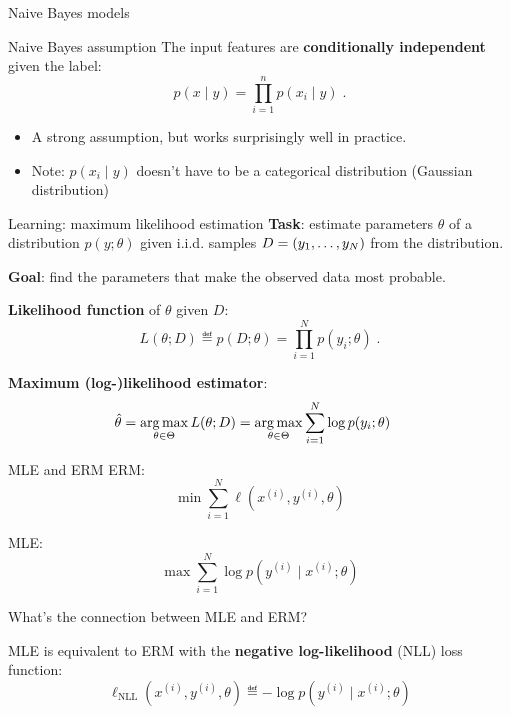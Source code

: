 \documentclass[usenames,dvipsnames,notes,11pt,aspectratio=169]{beamer}
\newcommand{\pdfnote}[1]{}
\begin{document}
\begin{frame}
    {Naive Bayes models}
    \begin{block}
    {Naive Bayes assumption}
        The input features are \textbf{conditionally independent} given the label:
        $$
        p(x\mid y) = \prod_{i=1}^n p(x_i\mid y) \;.
        $$
    \end{block}
    \begin{itemize}
        \item A strong assumption, but works surprisingly well in practice.

        \item Note: $p(x_i\mid y)$ doesn't have to be a categorical distribution (\eg Gaussian distribution)
    \end{itemize}

\end{frame}

\begin{frame}
    {Learning: maximum likelihood estimation}
    \textbf{Task}: estimate parameters $\theta$ of a distribution $p(y; \theta)$ given i.i.d. samples $D=\left( y_1, \ldots, y_N \right)$ from the distribution.

    \medskip
    \textbf{Goal}: find the parameters that make the observed data most probable.

    \medskip\pause
    \textbf{Likelihood function} of $\theta$ given $D$:
    $$
    L(\theta; D) \eqdef p(D;\theta) = \prod_{i=1}^N p(y_i; \theta) \;.
    $$

    \textbf{Maximum (log-)likelihood estimator}:
    \begin{align}
        \hat{\theta} &= \operatorname*{arg\,max}_{\theta\in\Theta} L(\theta; D)
        = \operatorname*{arg\,max}_{\theta\in\Theta} \sum_{i=1}^N \log p(y_i; \theta)
    \end{align}

    \pdfnote{To make ``most probable'' more precise, we define the likelihood function of the parameters to be the probability of the data given by the model.}
    \pdfnote{Why can we write the joint distribution as the product? Independent assumption from iid.}
    \pdfnote{Now it's reduced to an optimization problem.}
\end{frame}

\begin{frame}
    {MLE and ERM}
    ERM:
    $$
    \min \sum_{i=1}^N \ell(x^{(i)}, y^{(i)}, \theta)
    $$
    \pause

    MLE:
    $$
    \max \sum_{i=1}^N \log p(y^{(i)} \mid x^{(i)}; \theta)
    $$
    \pause

    What's the connection between MLE and ERM?

    \medskip
    MLE is equivalent to ERM with the \textbf{negative log-likelihood} (NLL) loss function:
    $$
    \ell_{\text{NLL}}(x^{(i)}, y^{(i)}, \theta) \eqdef -\log p(y^{(i)} \mid x^{(i)}; \theta)
    $$
\end{frame}
\end{document}
